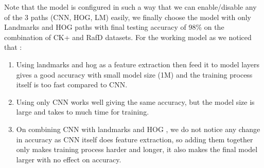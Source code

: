Note that the model is configured in such a way that we can enable/disable any of the 3 paths (CNN, HOG, LM) easily, we finally choose the model with only Landmarks and HOG paths with final testing accuracy of 98\% on the combination of CK+ and RafD datasets.
\newline
For the working model as we noticed that :
\begin{enumerate}
	\item Using landmarks and hog as a feature extraction then feed it to model layers gives a good accuracy with small model size (1M) and the training process itself is too fast compared to CNN.
	\item Using only CNN works well giving the same accuracy, but the model size is large and takes to much time for training.
	\item On combining CNN with landmarks and HOG , we do not notice any change in accuracy as CNN itself does feature extraction, so adding them together only makes training process harder and longer, it also makes the final model larger with no effect on accuracy.
\end{enumerate} 